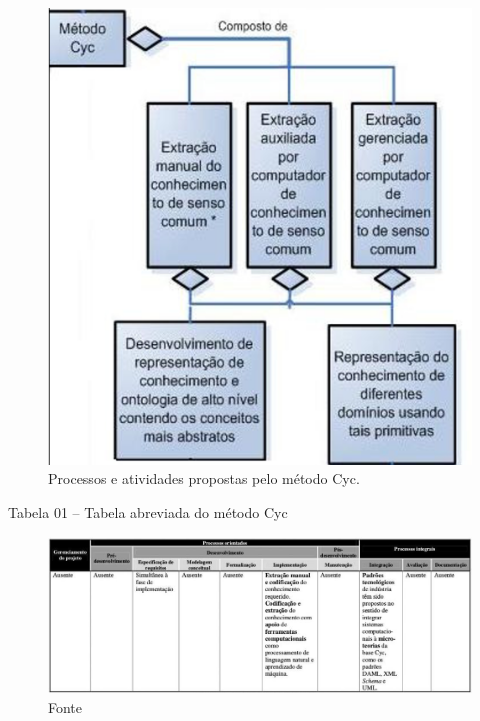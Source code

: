 \documentclass[a4paper]{report}
\begin{document}
\begin{figure}[h] 
\centering %
\includegraphics[scale=0.6]{Figuras/1.png} %
\caption[Processos e atividades propostas pelo método Cyc]{Processos e atividades propostas pelo método Cyc. %
}
\end{figure}

\pagebreak

Tabela 01 – Tabela abreviada do método Cyc
                                  
\begin{figure}[h] 
\centering %
\includegraphics[scale=0.3]{Figuras/2.png} %
\caption{Fonte %
}
\end{figure}
\end{document}
